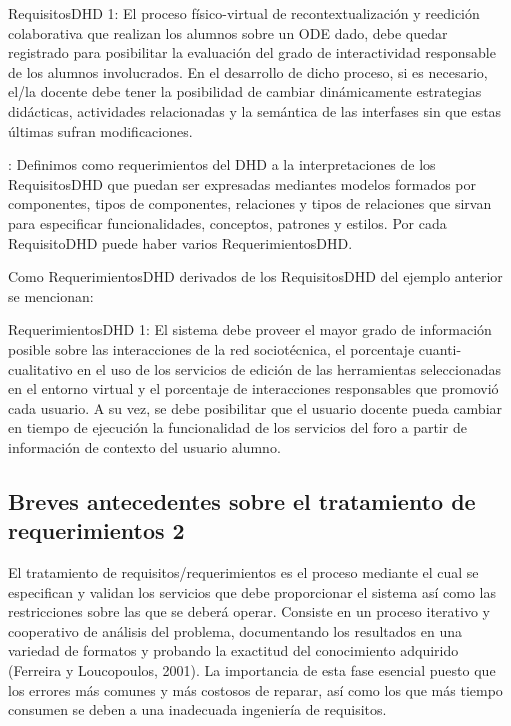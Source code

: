 \begin{ejemplo}
RequisitosDHD 1: El proceso físico-virtual de recontextualización y reedición colaborativa que realizan los alumnos sobre un ODE dado, debe quedar registrado para posibilitar la evaluación del grado de interactividad responsable de los alumnos involucrados. 
En el desarrollo de dicho proceso, si es necesario, el/la docente debe tener la posibilidad de cambiar dinámicamente estrategias didácticas, actividades relacionadas y la semántica de las interfases sin que estas últimas sufran modificaciones.
\end{ejemplo} \label{ejemplo1}

\begin{defi} : Definimos como requerimientos del
DHD a la interpretaciones de los RequisitosDHD que puedan ser expresadas
mediantes modelos formados por componentes, tipos de componentes, relaciones
y tipos de relaciones que sirvan para especificar funcionalidades, conceptos,
patrones y estilos. Por cada RequisitoDHD puede haber varios RequerimientosDHD.
\end{defi}\label{requerimiento}
 
Como RequerimientosDHD derivados de los RequisitosDHD del ejemplo anterior se mencionan:

\begin{ejemplo}
RequerimientosDHD 1: El sistema debe proveer el mayor grado de información posible sobre las interacciones de la red sociotécnica, el porcentaje cuanti-cualitativo en el uso de los servicios de edición de las herramientas seleccionadas en el entorno virtual y el porcentaje de interacciones responsables que promovió cada usuario.
A su vez, se debe posibilitar que el usuario docente pueda cambiar en tiempo
de ejecución la funcionalidad de los servicios del foro a partir de información
de contexto del usuario alumno.
\end{ejemplo} \label{ejemplo2}


\subsection{Breves antecedentes sobre el tratamiento de requerimientos 2}

El tratamiento de requisitos/requerimientos es el proceso mediante el cual se especifican
y validan los servicios que debe proporcionar el sistema así como las
restricciones sobre las que se deberá operar. Consiste en un proceso iterativo
y cooperativo de análisis del problema, documentando los resultados en
una variedad de formatos y probando la exactitud del conocimiento
adquirido (Ferreira y Loucopoulos, 2001). La importancia de esta fase
esencial puesto que los errores más comunes y más costosos de reparar, así
como los que más tiempo consumen se deben a una inadecuada ingeniería de
requisitos.

